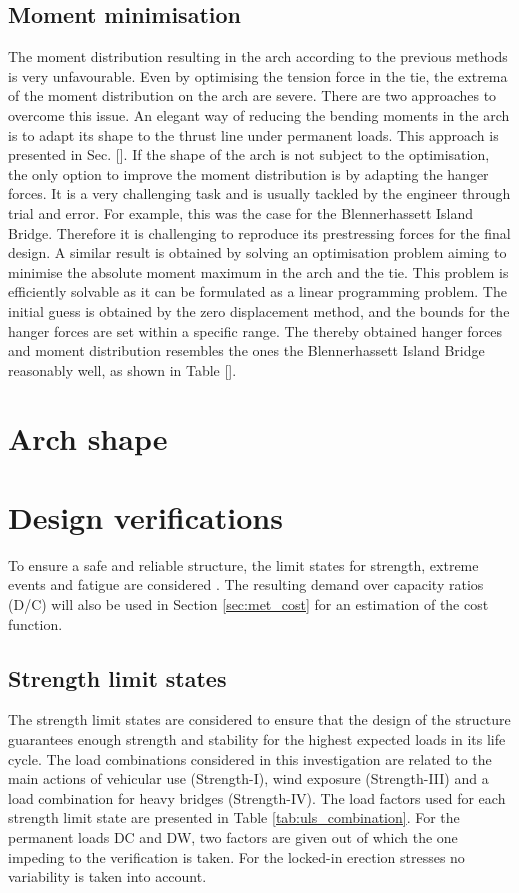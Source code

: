 \subsection{Moment minimisation}
The moment distribution resulting in the arch according to the previous methods is very unfavourable. Even by optimising the tension force in the tie, the extrema of the moment distribution on the arch are severe. There are two approaches to overcome this issue. An elegant way of reducing the bending moments in the arch is to adapt its shape to the thrust line under permanent loads. This approach is presented in Sec. []. If the shape of the arch is not subject to the optimisation, the only option to improve the moment distribution is by adapting the hanger forces. It is a very challenging task and is usually tackled by the engineer through trial and error. For example, this was the case for the Blennerhassett Island Bridge. Therefore it is challenging to reproduce its prestressing forces for the final design. A similar result is obtained by solving an optimisation problem aiming to minimise the absolute moment maximum in the arch and the tie. This problem is efficiently solvable as it can be formulated as a linear programming problem. The initial guess is obtained by the zero displacement method, and the bounds for the hanger forces are set within a specific range.  The thereby obtained hanger forces and moment distribution resembles the ones the Blennerhassett Island Bridge reasonably well, as shown in Table [].

\section{Arch shape} \label{sec:met_arch}

\newpage
\section{Design verifications} \label{sec:met_ver}
To ensure a safe and reliable structure, the limit states for strength, extreme events and fatigue are considered \cite{AASHTO}.  The resulting demand over capacity ratios (D/C) will also be used in Section \ref{sec:met_cost} for an estimation of the cost function.

\subsection{Strength limit states}
The strength limit states are considered to ensure that the design of the structure guarantees enough strength and stability for the highest expected loads in its life cycle. The load combinations considered in this investigation are related to the main actions of vehicular use (Strength-I), wind exposure (Strength-III) and a load combination for heavy bridges (Strength-IV). The load factors used for each strength limit state are presented in Table \ref{tab:uls_combination}. For the permanent loads DC and DW, two factors are given out of which the one impeding to the verification is taken. For the locked-in erection stresses no variability is taken into account.


